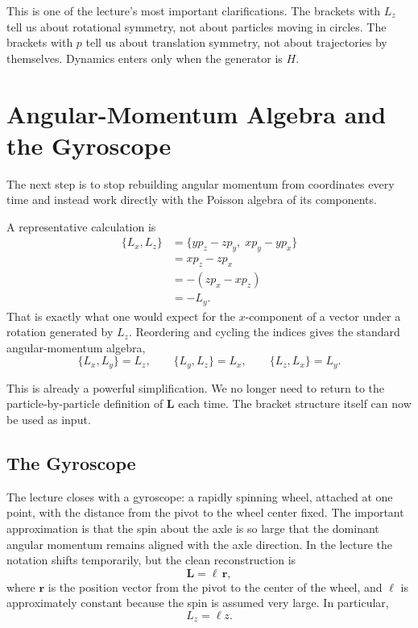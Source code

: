 This is one of the lecture's most important clarifications. The brackets with \(L_z\) tell us about rotational symmetry, not about particles moving in circles. The brackets with \(p\) tell us about translation symmetry, not about trajectories by themselves. Dynamics enters only when the generator is \(H\).

\section{Angular-Momentum Algebra and the Gyroscope}

The next step is to stop rebuilding angular momentum from coordinates every time and instead work directly with the Poisson algebra of its components.

A representative calculation is
\begin{align}
\{L_x,L_z\}
&=\{yp_z-zp_y,\;xp_y-yp_x\}\\
&=xp_z-zp_x\\
&=-(zp_x-xp_z)\\
&=-L_y.
\end{align}
That is exactly what one would expect for the \(x\)-component of a vector under a rotation generated by \(L_z\). Reordering and cycling the indices gives the standard angular-momentum algebra,
\begin{equation}
\{L_x,L_y\}=L_z,\qquad
\{L_y,L_z\}=L_x,\qquad
\{L_z,L_x\}=L_y.
\end{equation}

This is already a powerful simplification. We no longer need to return to the particle-by-particle definition of \(\mathbf L\) each time. The bracket structure itself can now be used as input.

\subsection{The Gyroscope}

The lecture closes with a gyroscope: a rapidly spinning wheel, attached at one point, with the distance from the pivot to the wheel center fixed. The important approximation is that the spin about the axle is so large that the dominant angular momentum remains aligned with the axle direction. In the lecture the notation shifts temporarily, but the clean reconstruction is
\begin{equation}
\mathbf L=\ell\,\mathbf r,
\end{equation}
where \(\mathbf r\) is the position vector from the pivot to the center of the wheel, and \(\ell\) is approximately constant because the spin is assumed very large. In particular,
\begin{equation}
L_z=\ell z.
\end{equation}

